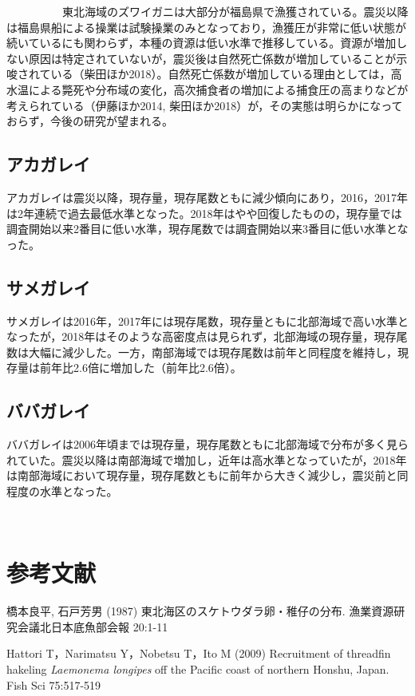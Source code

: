 \documentclass[11pt]{article} %
\begin{document}
\begin{linenumbers}
\ \ \ \ \ \ \ \ \ \ 
東北海域のズワイガニは大部分が福島県で漁獲されている。震災以降は福島県船による操業は試験操業のみとなっており，漁獲圧が非常に低い状態が続いているにも関わらず，本種の資源は低い水準で推移している。資源が増加しない原因は特定されていないが，震災後は自然死亡係数が増加していることが示唆されている（柴田ほか2018）。自然死亡係数が増加している理由としては，高水温による斃死や分布域の変化，高次捕食者の増加による捕食圧の高まりなどが考えられている（伊藤ほか2014, 柴田ほか2018）が，その実態は明らかになっておらず，今後の研究が望まれる。

\subsection{アカガレイ}
アカガレイは震災以降，現存量，現存尾数ともに減少傾向にあり，2016，2017年は2年連続で過去最低水準となった。2018年はやや回復したものの，現存量では調査開始以来2番目に低い水準，現存尾数では調査開始以来3番目に低い水準となった。

\subsection{サメガレイ}
サメガレイは2016年，2017年には現存尾数，現存量ともに北部海域で高い水準となったが，2018年はそのような高密度点は見られず，北部海域の現存量，現存尾数は大幅に減少した。一方，南部海域では現存尾数は前年と同程度を維持し，現存量は前年比2.6倍に増加した（前年比2.6倍）。

\subsection{ババガレイ}
ババガレイは2006年頃までは現存量，現存尾数ともに北部海域で分布が多く見られていた。震災以降は南部海域で増加し，近年は高水準となっていたが，2018年は南部海域において現存量，現存尾数ともに前年から大きく減少し，震災前と同程度の水準となった。

\ \ \ \ \ \ \ \ \ \ 
\section{参考文献}
\hangindent=30pt
\noindent
橋本良平, 石戸芳男 (1987) 東北海区のスケトウダラ卵・稚仔の分布. 漁業資源研究会議北日本底魚部会報 20:1-11

\hangindent=30pt
\noindent
Hattori T，Narimatsu Y，Nobetsu T，Ito M (2009) Recruitment of threadfin hakeling \textit{Laemonema longipes} off the Pacific coast of northern Honshu, Japan. Fish Sci 75:517-519


\end{linenumbers}
\end{document}
